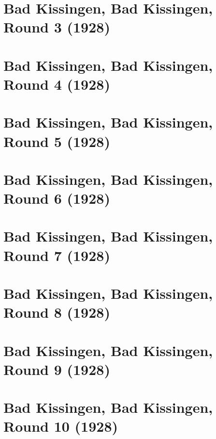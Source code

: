 \documentclass[11pt]{article}
\begin{document}
\clearpage

\section{Bad Kissingen, Bad Kissingen, Round 3 (1928)}


\clearpage

\section{Bad Kissingen, Bad Kissingen, Round 4 (1928)}


\clearpage

\section{Bad Kissingen, Bad Kissingen, Round 5 (1928)}


\clearpage

\section{Bad Kissingen, Bad Kissingen, Round 6 (1928)}


\clearpage

\section{Bad Kissingen, Bad Kissingen, Round 7 (1928)}


\clearpage

\section{Bad Kissingen, Bad Kissingen, Round 8 (1928)}


\clearpage

\section{Bad Kissingen, Bad Kissingen, Round 9 (1928)}


\clearpage

\section{Bad Kissingen, Bad Kissingen, Round 10 (1928)}

\end{document}
